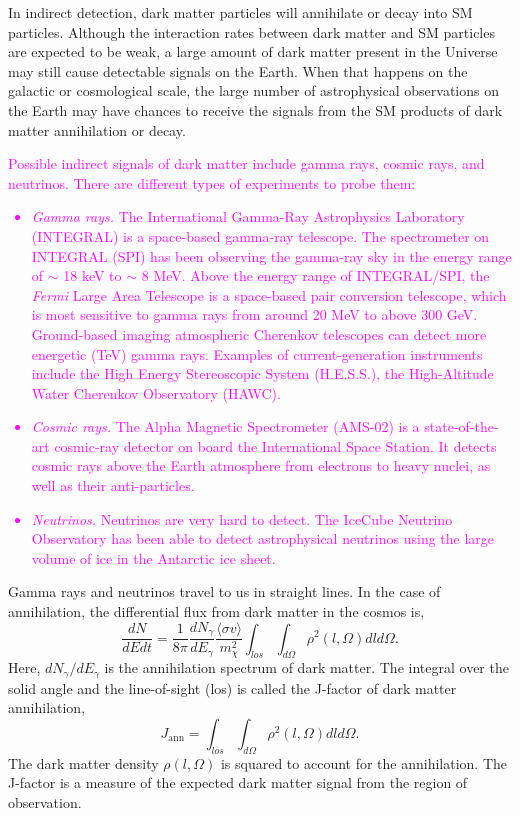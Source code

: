 \documentclass[doublespace,nopageskip]{VTthesis} %
\newcommand{\DS}[1]{\textcolor{magenta}{#1}}
\newcommand{\sigmav}{\langle\sigma v\rangle}
\begin{document}
In indirect detection, dark matter particles will annihilate or decay into SM particles. Although the interaction rates between dark matter and SM particles are expected to be weak, a large amount of dark matter present in the Universe may still cause detectable signals on the Earth. When that happens on the galactic or cosmological scale, the large number of astrophysical observations on the Earth may have chances to receive the signals from the SM products of dark matter annihilation or decay. 

\DS{
Possible indirect signals of dark matter include gamma rays, cosmic rays, and neutrinos. There are different types of experiments to probe them:
\begin{itemize}
    \item \emph{Gamma rays.} The International Gamma-Ray Astrophysics Laboratory (INTEGRAL) is a space-based gamma-ray telescope. The spectrometer on INTEGRAL (SPI) has been observing the gamma-ray sky in the energy range of $\sim$ 18 keV to $\sim$ 8 MeV. Above the energy range of INTEGRAL/SPI, the \textit{Fermi} Large Area Telescope is a space-based pair conversion telescope, which is most sensitive to gamma rays from around 20 MeV to above 300 GeV. Ground-based imaging atmospheric Cherenkov telescopes can detect more energetic (TeV) gamma rays. Examples of current-generation instruments include the High Energy Stereoscopic System (H.E.S.S.), the High-Altitude Water Cherenkov Observatory (HAWC).
    \item \emph{Cosmic rays.} The Alpha Magnetic Spectrometer (AMS-02) is a state-of-the-art cosmic-ray detector on board the International Space Station. It detects cosmic rays above the Earth atmosphere from electrons to heavy nuclei, as well as their anti-particles.
    \item \emph{Neutrinos.} Neutrinos are very hard to detect. The  IceCube Neutrino Observatory has been able to detect astrophysical neutrinos using the large volume of ice in the Antarctic ice sheet.
\end{itemize}
}

Gamma rays and neutrinos travel to us in straight lines. In the case of annihilation, the differential flux from dark matter in the cosmos is,
\begin{equation}\label{eq:ann}
    \frac{dN}{dEdt} = \frac{1}{8\pi}\frac{dN_\gamma}{dE_\gamma}\frac{\sigmav}{m_\chi^2}\int_{los}\int_{d\Omega}\rho^2(l,\Omega)dld\Omega.
\end{equation}
Here, $dN_\gamma/dE_\gamma$ is the annihilation spectrum of dark matter. The integral over the solid angle and the line-of-sight (los) is called the J-factor of dark matter annihilation,
\begin{equation}\label{eq:jfactor}
    J_\mathrm{ann} = \int_{los}\int_{d\Omega}\rho^2(l,\Omega)dld\Omega.
\end{equation}
The dark matter density $\rho(l,\Omega)$ is squared to account for the annihilation. The J-factor is a measure of the expected dark matter signal from the region of observation.
\end{document}
